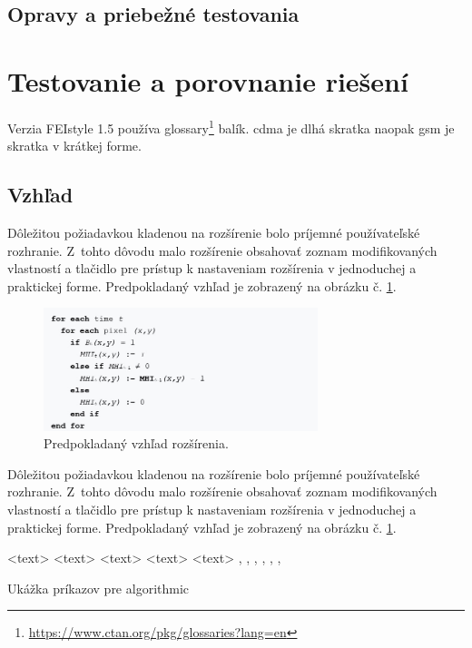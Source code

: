 \subsection{Opravy a priebežné testovania}

\section{Testovanie a porovnanie riešení}
\noindent Verzia FEIstyle 1.5 používa glossary\footnote{\url{https://www.ctan.org/pkg/glossaries?lang=en}} balík.
\acrfull{cdma} je dlhá skratka naopak \acrshort{gsm} je skratka v krátkej forme.


\subsection{Vzhľad}
\noindent Dôležitou požiadavkou kladenou na rozšírenie bolo príjemné používateľské rozhranie. Z~tohto dôvodu malo rozšírenie obsahovať zoznam modifikovaných vlastností a tlačidlo pre prístup k nastaveniam rozšírenia v jednoduchej a praktickej forme. Predpokladaný vzhľad je zobrazený na obrázku č. \ref{vzhladobr}.
\begin{figure}[!htbp]
  \centering
  \includegraphics[width=8cm]{img/MHIalg.jpg}
  \caption{Predpokladaný vzhľad rozšírenia.}
  \label{vzhladobr}
\end{figure}	 
\noindent Dôležitou požiadavkou kladenou na rozšírenie bolo príjemné používateľské rozhranie.\cite{t00} Z~tohto dôvodu malo rozšírenie obsahovať zoznam modifikovaných vlastností a tlačidlo pre prístup k nastaveniam rozšírenia v jednoduchej a praktickej forme. Predpokladaný vzhľad je zobrazený na obrázku č. \ref{vzhladobr}.

\begin{algorithm}
\scriptsize
\begin{algorithmic}
 \STATE <text>
   \ELSE {} \ENDIF
     \ENDIF
   \ENDFOR
   \ENDFOR
   \ENDFOR
   \ENDWHILE
 \REPEAT {} 
 \LOOP {} \ENDLOOP
 \REQUIRE <text>
 \ENSURE <text>
 \RETURN <text>
 \PRINT <text>
 \AND, \OR, \XOR, \NOT, \TO, \TRUE, \FALSE
\end{algorithmic}
\caption{Ukážka príkazov pre algorithmic}  
\label{alg:preview}  
\end{algorithm}

